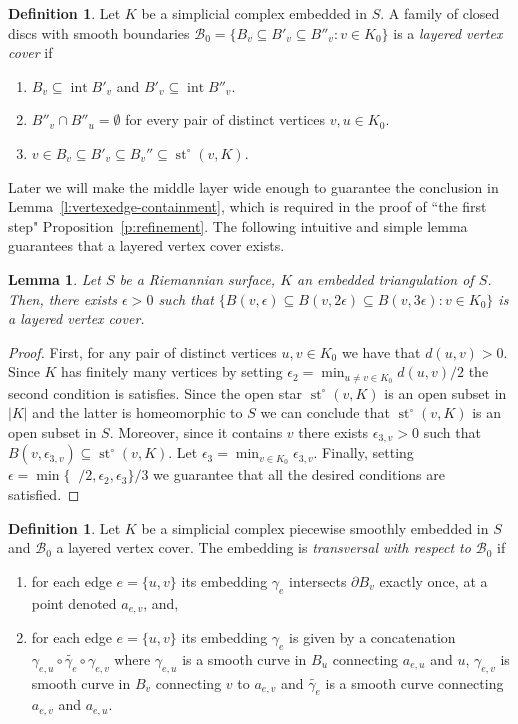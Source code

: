 \documentclass[11pt]{article}
\newtheorem{lemma}[theorem]{Lemma}
\numberwithin{claimcounter}{theorem}
\theoremstyle{remark}
\theoremstyle{definition}
\newtheorem{definition}[theorem]{Definition}
\numberwithin{theorem}{section}
\DeclareMathOperator{\st}{st}
\DeclareMathOperator{\interior}{int}
\DeclareMathOperator{\rinj}{r_{inj}}
\begin{document}
%
\begin{definition}
    Let $K$ be a simplicial complex embedded in $S$. A family of closed discs with smooth boundaries $\mathcal{B}_0 = \{B_v \subseteq B'_v \subseteq B''_v \colon v\in K_0 \}$ is a \emph{layered vertex cover} if 
    \begin{enumerate}
        \item $B_v\subseteq \interior B'_v$ and $B'_v\subseteq \interior B''_v$.
        \item $B''_v\cap B''_u = \emptyset$ for every pair of distinct vertices $v,u\in K_0$.
        \item $v \in B_v\subseteq B'_v\subseteq B_v'' \subseteq \st^\circ(v,K)$.
    \end{enumerate}
\end{definition}
Later we will make the middle layer wide enough to guarantee the conclusion in Lemma~\ref{l:vertexedge-containment}, which is required in the proof of ``the first step" Proposition~\ref{p:refinement}.
%
The following intuitive and simple lemma guarantees that a layered vertex cover exists. 
\begin{lemma}
\label{l:vertexdisc}
Let $S$ be a Riemannian surface, $K$ an embedded triangulation of $S$. Then, there exists $\epsilon>0$ such that $\{B(v,\epsilon)\subseteq B(v,2\epsilon) \subseteq B(v,3\epsilon) \colon v\in K_0 \}$ is a layered vertex cover.
\end{lemma}
\begin{proof}    
    First, for any pair of distinct vertices $u,v\in K_0$ we have that $d(u,v)>0$. Since $K$ has finitely many vertices by setting $\epsilon_2 = \min_{u\neq v\in K_0}d(u,v)/2$ the second condition is satisfies.
%
    Since the open star $\st^\circ(v,K)$ is an open subset in $|K|$ and the latter is homeomorphic to $S$ we can conclude that $\st^\circ(v,K)$ is an open subset in $S$. Moreover, since it contains $v$ there exists $\epsilon_{3,v}>0$ such that $B(v,\epsilon_{3,v})\subseteq \st^\circ(v,K)$.
    Let $\epsilon_3=\min_{v\in K_0} \epsilon_{3,v}$.
%
    Finally, setting $\epsilon=\min\{\rinj/2,\epsilon_2,\epsilon_3\}/3$ we guarantee that all the desired conditions are satisfied.
\end{proof}
%
\begin{definition}
    Let $K$ be a simplicial complex piecewise smoothly embedded in $S$ and $\mathcal{B}_0$ a layered vertex cover. The embedding is \emph{transversal with respect to $\mathcal{B}_0$} if
    \begin{enumerate}
        \item for each edge $e=\{u,v\}$ its embedding $\gamma_e$ intersects $\partial B_v$ exactly once, at a point denoted $a_{e,v}$, and, 
        \item for each edge $e=\{u,v\}$ its embedding $\gamma_e$ is given by a concatenation $\gamma_{e,u}\circ \widetilde{\gamma_e}\circ \gamma_{e,v}$ where $\gamma_{e,u}$ is a smooth curve in $B_u$ connecting $a_{e,u}$ and $u$, $\gamma_{e,v}$ is smooth curve in $B_v$ connecting $v$ to $a_{e,v}$ and $\widetilde{\gamma_e}$ is a smooth curve connecting $a_{e,v}$ and $a_{e,u}$.
    \end{enumerate}
\end{definition}
\end{document}
